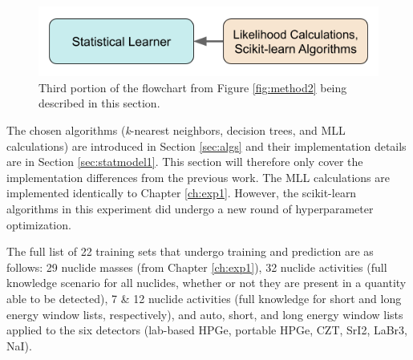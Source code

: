 
\begin{figure}[H]
  \centering
  \includegraphics[width=0.7\linewidth]{./chapters/exp2/methodology2_3.png}
  \caption{Third portion of the flowchart from Figure \ref{fig:method2} being 
           described in this section.}
\end{figure}

The chosen algorithms (\textit{k}-nearest neighbors, decision trees, and
\gls{MLL} calculations) are introduced in Section \ref{sec:algs} and their
implementation details are in Section \ref{sec:statmodel1}.  This section will
therefore only cover the implementation differences from the previous work.
The \gls{MLL} calculations are implemented identically to Chapter
\ref{ch:exp1}.  However, the scikit-learn algorithms in this experiment did
undergo a new round of hyperparameter optimization.

The full list of 22 training sets that undergo training and prediction are as
follows: 29 nuclide masses (from Chapter \ref{ch:exp1}), 32 nuclide activities
(full knowledge scenario for all nuclides, whether or not they are present in a
quantity able to be detected), 7 \& 12 nuclide activities (full knowledge for
short and long energy window lists, respectively), and auto, short, and long
energy window lists applied to the six detectors (lab-based \gls{HPGe},
portable \gls{HPGe}, \gls{CZT}, \gls{SrI2}, \gls{LaBr3}, \gls{NaI}). 

